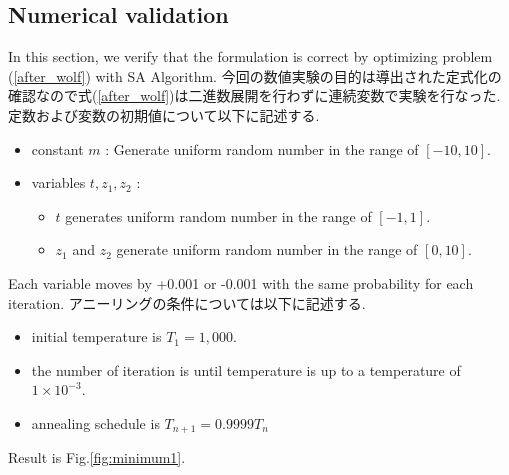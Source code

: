 \documentclass[fp,twocolumn]{jpsj3}
\begin{document}
\subsection{Numerical validation}
In this section, we verify that the formulation is correct by optimizing problem (\ref{after_wolf}) with SA Algorithm. 今回の数値実験の目的は導出された定式化の確認なので式(\ref{after_wolf})は二進数展開を行わずに連続変数で実験を行なった. 定数および変数の初期値について以下に記述する.
\begin{itemize}
\item constant $m$ : Generate uniform random number in the range of $[-10,10]$.
\item variables $t, z_{1}, z_{2}$ : 
  \begin{itemize}
  \item $t$ generates uniform random number in the range of $[-1,1]$.
  \item $z_{1}$ and $z_{2}$ generate uniform random number in the range of $[0,10]$.
  \end{itemize}
\end{itemize}
Each variable moves by +0.001 or -0.001 with the same probability for each iteration. アニーリングの条件については以下に記述する.
\begin{itemize}
\item initial temperature is $T_{1}=1,000$.
\item the number of iteration is until temperature is up to a temperature of $1\times 10^{-3}$.
\item annealing schedule is $T_{n+1}=0.9999T_{n}$
\end{itemize}
 Result is Fig.\ref{fig:minimum1}.
\end{document}
